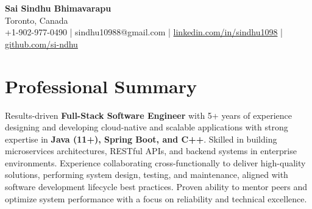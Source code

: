 \documentclass[letterpaper,11pt]{article}
\begin{document}
\begin{center}
  {\Large \textbf{Sai Sindhu Bhimavarapu}} \\
  Toronto, Canada \\
  +1-902-977-0490 \enspace | \enspace sindhu10988@gmail.com \enspace | \enspace \href{https://www.linkedin.com/in/sindhu1098/}{linkedin.com/in/sindhu1098} \enspace | \enspace \href{https://github.com/si-ndhu}{github.com/si-ndhu}
\end{center}

\section{Professional Summary}
  \begin{itemize}[leftmargin=0.15in, label={}]
    \small{\item{
     Results-driven \textbf{Full-Stack Software Engineer} with 5+ years of experience designing and developing cloud-native and scalable applications with strong expertise in \textbf{Java (11+), Spring Boot, and C++}. Skilled in building microservices architectures, RESTful APIs, and backend systems in enterprise environments. Experience collaborating cross-functionally to deliver high-quality solutions, performing system design, testing, and maintenance, aligned with software development lifecycle best practices. Proven ability to mentor peers and optimize system performance with a focus on reliability and technical excellence.
    }}
  \end{itemize}
\vspace{-16pt}

\end{document}
